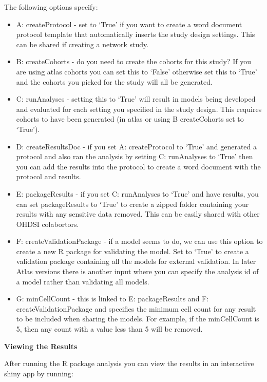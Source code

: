 \documentclass[11pt]{book}
\providecommand{\tightlist}{%
  \setlength{\itemsep}{0pt}\setlength{\parskip}{0pt}}
\begin{document}
The following options specify:

\begin{itemize}
\tightlist
\item
  A: createProtocol - set to `True' if you want to create a word
  document protocol template that automatically inserts the study design
  settings. This can be shared if creating a network study.
\item
  B: createCohorts - do you need to create the cohorts for this study?
  If you are using atlas cohorts you can set this to `False' otherwise
  set this to `True' and the cohorts you picked for the study will all
  be generated.
\item
  C: runAnalyses - setting this to `True' will result in models being
  developed and evaluated for each setting you specified in the study
  design. This requires cohorts to have been generated (in atlas or
  using B createCohorts set to `True').
\item
  D: createResultsDoc - if you set A: createProtocol to `True' and
  generated a protocol and also ran the analysis by setting C:
  runAnalyses to `True' then you can add the results into the protocol
  to create a word document with the protocol and results.
\item
  E: packageResults - if you set C: runAnalyses to `True' and have
  results, you can set packageResults to `True' to create a zipped
  folder containing your results with any sensitive data removed. This
  can be easily shared with other OHDSI colabortors.
\item
  F: createValidationPackage - if a model seems to do, we can use this
  option to create a new R package for validating the model. Set to
  `True' to create a validation package containing all the models for
  external validation. In later Atlas versions there is another input
  where you can specify the analysis id of a model rather than
  validating all models.
\item
  G: minCellCount - this is linked to E: packageResults and F:
  createValidationPackage and specifies the minimum cell count for any
  result to be included when sharing the models. For example, if the
  minCellCount is 5, then any count with a value less than 5 will be
  removed.
\end{itemize}

\textbf{Viewing the Results}

After running the R package analysis you can view the results in an
interactive shiny app by running:
\end{document}
